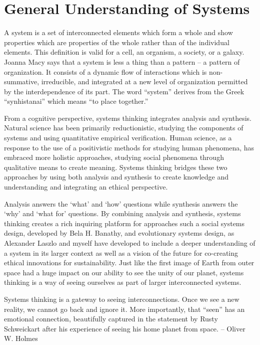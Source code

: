 \section{General Understanding of Systems}\label{sec:generalUnderstandingSystems}

A system is a set of interconnected elements which form a whole and show properties which are properties of the whole rather than of the individual elements. This definition is valid for a cell, an organism, a society, or a galaxy. Joanna Macy says that a system is less a thing than a pattern – a pattern of organization. It consists of a dynamic flow of interactions which is non-summative, irreducible, and integrated at a new level of organization permitted by the interdependence of its part. The word “system” derives from the Greek “synhistanai” which means “to place together.”

From a cognitive perspective, systems thinking integrates analysis and synthesis. Natural science has been primarily reductionistic, studying the components of systems and using quantitative empirical verification. Human science, as a response to the use of a positivistic methods for studying human phenomena, has embraced more holistic approaches, studying social phenomena through qualitative means to create meaning. Systems thinking bridges these two approaches by using both analysis and synthesis to create knowledge and understanding and integrating an ethical perspective.

Analysis answers the ‘what’ and ‘how’ questions while synthesis answers the ‘why’ and ‘what for’ questions. By combining analysis and synthesis, systems thinking creates a rich inquiring platform for approaches such a social systems design, developed by Bela H. Banathy, and evolutionary systems design, as Alexander Laszlo and myself have developed to include a deeper understanding of a system in its larger context as well as a vision of the future for co-creating ethical innovations for sustainability. Just like the first image of Earth from outer space had a huge impact on our ability to see the unity of our planet, systems thinking is a way of seeing ourselves as part of larger interconnected systems.

Systems thinking is a gateway to seeing interconnections. Once we see a new reality, we cannot go back and ignore it. More importantly, that “seen” has an emotional connection, beautifully captured in the statement by Rusty Schweickart after his experience of seeing his home planet from space. – Oliver W. Holmes

